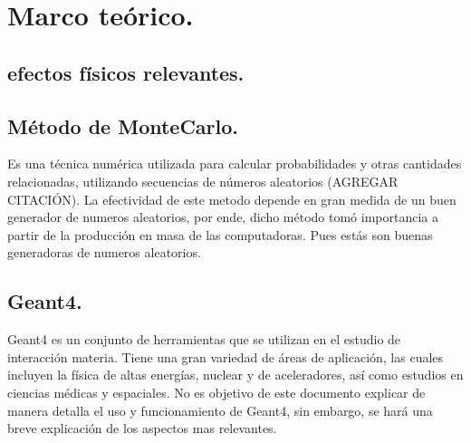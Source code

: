 \chapter{Marco teórico.}

\section{efectos físicos relevantes.}


\section{Método de MonteCarlo.}

Es una técnica numérica utilizada para calcular probabilidades y otras cantidades relacionadas, utilizando secuencias de números aleatorios (AGREGAR CITACIÓN). La efectividad de este metodo depende en gran medida de un buen generador de numeros aleatorios, por ende, dicho método tomó importancia a partir de la producción en masa de las computadoras. Pues estás son buenas generadoras de numeros aleatorios. 

\section{Geant4.}
Geant4 es un conjunto de herramientas que se utilizan en el estudio de interacción materia. Tiene una gran variedad de áreas de aplicación, las cuales incluyen la física de altas energías, nuclear y de aceleradores, así como estudios en ciencias médicas y espaciales. No es objetivo de este documento explicar de manera detalla el uso y funcionamiento de Geant4, sin embargo, se hará una breve explicación de los aspectos mas relevantes.

